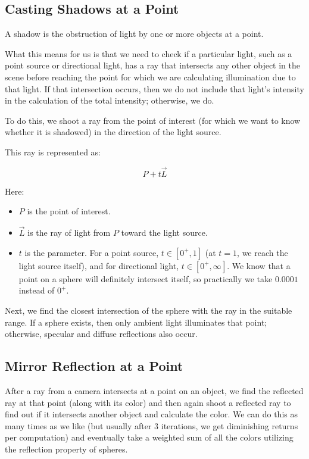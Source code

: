 \documentclass{article}
\begin{document}
\subsection{Casting Shadows at a Point}

A shadow is the obstruction of light by one or more objects at a point. 

What this means for us is that we need to check if a particular light, such as a point source or directional light, has a ray that intersects any other object in the scene before reaching the point for which we are calculating illumination due to that light. If that intersection occurs, then we do not include that light's intensity in the calculation of the total intensity; otherwise, we do.

To do this, we shoot a ray from the point of interest (for which we want to know whether it is shadowed) in the direction of the light source.

This ray is represented as:

$$P + t \vec{L}$$

Here:
\begin{itemize}
    \item $P$ is the point of interest.
    \item $\vec{L}$ is the ray of light from $P$ toward the light source.
    \item $t$ is the parameter. For a point source, $t \in [0^+, 1]$ (at $t=1$, we reach the light source itself), and for directional light, $t \in [0^+, \infty]$. We know that a point on a sphere will definitely intersect itself, so practically we take $0.0001$ instead of $0^+$.
\end{itemize}

Next, we find the closest intersection of the sphere with the ray in the suitable range. If a sphere exists, then only ambient light illuminates that point; otherwise, specular and diffuse reflections also occur.

\subsection{Mirror Reflection at a Point}

After a ray from a camera intersects at a point on an object, we find the reflected ray at that point (along with its color) and then again shoot a reflected ray to find out if it intersects another object and calculate the color. We can do this as many times as we like (but usually after 3 iterations, we get diminishing returns per computation) and eventually take a weighted sum of all the colors utilizing the reflection property of spheres.
\end{document}
